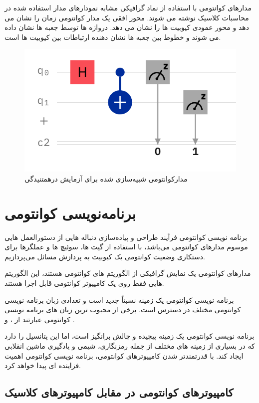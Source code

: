 \documentclass{book}
\begin{document}
مدارهای کوانتومی با استفاده از نماد گرافیکی مشابه نمودارهای مدار استفاده شده در محاسبات کلاسیک نوشته می شوند. محور افقی یک مدار کوانتومی زمان را نشان می دهد و محور عمودی کیوبیت ها را نشان می دهد. دروازه ها توسط جعبه ها نشان داده می شوند و خطوط بین جعبه ها نشان دهنده ارتباطات بین کیوبیت ها است.

\begin{figure}[ht]
	\centering
	\includegraphics[]{meas-firstcirc.png}
	\caption{مدارکوانتومی شبیه‌سازی شده برای آزمایش درهمتنیدگی}
\end{figure}


\newpage
\chapter{برنامه‌نویسی کوانتومی}
برنامه نویسی کوانتومی فرآیند طراحی و پیاده‌سازی دنباله هایی از دستورالعمل هایی موسوم مدارهای کوانتومی می‌باشد، با استفاده از گیت ها، سوئیچ ها و عملگرها برای دستکاری وضعیت کوانتومی یک کیوبیت به پردازش مسائل می‌پردازیم.

مدارهای کوانتومی یک نمایش گرافیکی از الگوریتم های کوانتومی هستند، این الگوریتم هایی فقط روی یک کامپیوتر کوانتومی قابل اجرا هستند.

برنامه نویسی کوانتومی یک زمینه نسبتاً جدید است و تعدادی زبان برنامه نویسی کوانتومی مختلف در دسترس است. برخی از محبوب ترین زبان های برنامه نویسی کوانتومی عبارتند از ،  و .

برنامه نویسی کوانتومی یک زمینه پیچیده و چالش برانگیز است، اما این پتانسیل را دارد که در بسیاری از زمینه های مختلف از جمله رمزنگاری، شیمی و یادگیری ماشین انقلابی ایجاد کند. با قدرتمندتر شدن کامپیوترهای کوانتومی، برنامه نویسی کوانتومی اهمیت فزاینده ای پیدا خواهد کرد.
\section{کامپیوترهای کوانتومی در مقابل کامپیوترهای کلاسیک}
\end{document}
